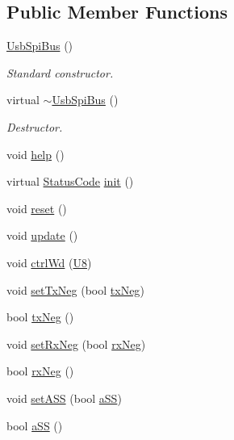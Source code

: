 \subsection*{Public Member Functions}
\begin{DoxyCompactItemize}
\item 
\hyperlink{classUsbSpiBus_a75b47c1938d8ee80eb3a32f19765b05e}{Usb\+Spi\+Bus} ()
\begin{DoxyCompactList}\small\item\em Standard constructor. \end{DoxyCompactList}\item 
virtual \hyperlink{classUsbSpiBus_abeabcef3ac01134582fe275c89b9922f}{$\sim$\+Usb\+Spi\+Bus} ()
\begin{DoxyCompactList}\small\item\em Destructor. \end{DoxyCompactList}\item 
void \hyperlink{classUsbSpiBus_a3543b3bbad0c137fde32fdc554a09a5d}{help} ()
\item 
virtual \hyperlink{classStatusCode}{Status\+Code} \hyperlink{classUsbSpiBus_a38203aaf0806b9a1c7cc0686831a7ce9}{init} ()
\item 
void \hyperlink{classUsbSpiBus_aa795a27f7429f0c0285056964659d433}{reset} ()
\item 
void \hyperlink{classUsbSpiBus_a3e26195827351bf88db56dafd1e7de26}{update} ()
\item 
void \hyperlink{classUsbSpiBus_a150304008d73d14c93d25765050ddb05}{ctrl\+Wd} (\hyperlink{classUsbSpiBus_a11336f4ad104fbd4fb454be044f19fc8}{U8})
\item 
void \hyperlink{classUsbSpiBus_a6b15114d79e0d8002ba42f0301ff22a1}{set\+Tx\+Neg} (bool \hyperlink{classUsbSpiBus_a08605d71903fc384ed119842833485f1}{tx\+Neg})
\item 
bool \hyperlink{classUsbSpiBus_a08605d71903fc384ed119842833485f1}{tx\+Neg} ()
\item 
void \hyperlink{classUsbSpiBus_aa6c039bb03737e9fd943cbdd2b23388c}{set\+Rx\+Neg} (bool \hyperlink{classUsbSpiBus_ab24f6e85697305b26997b8dec3f18254}{rx\+Neg})
\item 
bool \hyperlink{classUsbSpiBus_ab24f6e85697305b26997b8dec3f18254}{rx\+Neg} ()
\item 
void \hyperlink{classUsbSpiBus_a1a0278c7994ba1fa84919383bd816047}{set\+A\+SS} (bool \hyperlink{classUsbSpiBus_afd9b0823f348dddc7fed8ae97d248e9c}{a\+SS})
\item 
bool \hyperlink{classUsbSpiBus_afd9b0823f348dddc7fed8ae97d248e9c}{a\+SS} ()

\end{DoxyCompactItemize}
